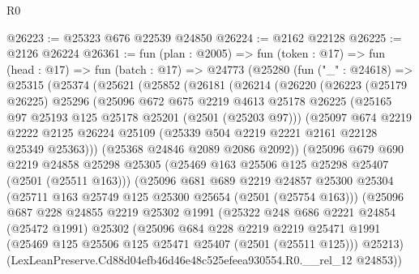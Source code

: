 \begin{lexlean}{R0}
\begin{coremodule}
@26223 := @25323 @676 @22539 @24850
@26224 := @2162 @22128
@26225 := @2126 @26224
@26361 := fun (plan : @2005) =>
  fun (token : @17) =>
  fun (head : @17) =>
  fun (batch : @17) =>
  @24773
    (@25280
      (fun ("_" : @24618) =>
      @25315
        (@25374
          (@25621
            (@25852
              (@26181
                (@26214
                  (@26220
                    (@26223
                      (@25179 @26225)
                      @25296
                      (@25096
                        @672
                        @675
                        @2219
                        @4613
                        @25178
                        @26225
                        (@25165 @97 @25193 @125 @25178 @25201 (@2501 (@25203 @97)))
                        (@25097
                          @674
                          @2219
                          @2222
                          @2125
                          @26224
                          @25109
                          (@25339 @504 @2219 @2221 @2161 @22128 @25349 @25363)))
                      (@25368 @24846 @2089 @2086 @2092))
                    (@25096
                      @679
                      @690
                      @2219
                      @24858
                      @25298
                      @25305
                      (@25469 @163 @25506 @125 @25298 @25407 (@2501 (@25511 @163)))
                      (@25096
                        @681
                        @689
                        @2219
                        @24857
                        @25300
                        @25304
                        (@25711 @163 @25749 @125 @25300 @25654 (@2501 (@25754 @163)))
                        (@25096
                          @687
                          @228
                          @24855
                          @2219
                          @25302
                          @1991
                          (@25322
                            @248
                            @686
                            @2221
                            @24854
                            (@25472 @1991)
                            @25302
                            (@25096
                              @684
                              @228
                              @2219
                              @2219
                              @25471
                              @1991
                              (@25469 @125 @25506 @125 @25471 @25407 (@2501 (@25511 @125)))
                              @25213)
                            (LexLeanPreserve.Cd88d04efb46d46e48c525efeea930554.R0.__rel_12 @24853))

\end{coremodule}
\end{lexlean}
